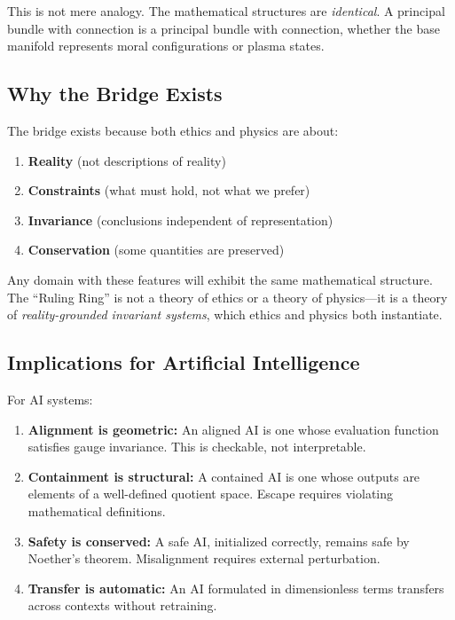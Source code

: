 \documentclass[12pt]{article}
\begin{document}
This is not mere analogy. The mathematical structures are \textit{identical}. A principal bundle with connection is a principal bundle with connection, whether the base manifold represents moral configurations or plasma states.

\subsection{Why the Bridge Exists}

The bridge exists because both ethics and physics are about:

\begin{enumerate}
    \item \textbf{Reality} (not descriptions of reality)
    \item \textbf{Constraints} (what must hold, not what we prefer)
    \item \textbf{Invariance} (conclusions independent of representation)
    \item \textbf{Conservation} (some quantities are preserved)
\end{enumerate}

Any domain with these features will exhibit the same mathematical structure. The ``Ruling Ring'' is not a theory of ethics or a theory of physics---it is a theory of \textit{reality-grounded invariant systems}, which ethics and physics both instantiate.

\subsection{Implications for Artificial Intelligence}

For AI systems:

\begin{enumerate}
    \item \textbf{Alignment is geometric:} An aligned AI is one whose evaluation function satisfies gauge invariance. This is checkable, not interpretable.

    \item \textbf{Containment is structural:} A contained AI is one whose outputs are elements of a well-defined quotient space. Escape requires violating mathematical definitions.

    \item \textbf{Safety is conserved:} A safe AI, initialized correctly, remains safe by Noether's theorem. Misalignment requires external perturbation.

    \item \textbf{Transfer is automatic:} An AI formulated in dimensionless terms transfers across contexts without retraining.
\end{enumerate}
\end{document}
